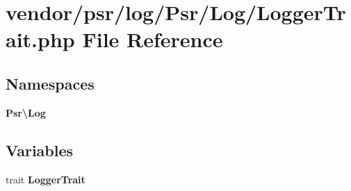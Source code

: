 \section{vendor/psr/log/\+Psr/\+Log/\+Logger\+Trait.php File Reference}
\label{_logger_trait_8php}
\subsection*{Namespaces}
\begin{DoxyCompactItemize}
\item 
 {\bf Psr\textbackslash{}\+Log}
\end{DoxyCompactItemize}
\subsection*{Variables}
\begin{DoxyCompactItemize}
\item 
trait {\bf Logger\+Trait}
\end{DoxyCompactItemize}
